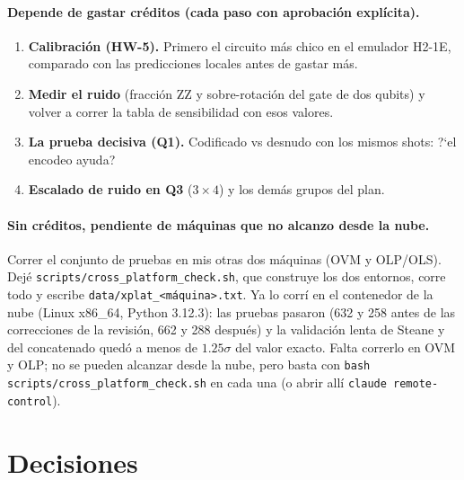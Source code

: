 \documentclass[11pt,a4paper]{article}
\begin{document}
\paragraph{Depende de gastar cr\'editos (cada paso con aprobaci\'on expl\'icita).}
\begin{enumerate}[leftmargin=1.6em]
  \item \textbf{Calibraci\'on (HW-5).} Primero el circuito m\'as chico en el emulador H2-1E, comparado con las
    predicciones locales antes de gastar m\'as.
  \item \textbf{Medir el ruido} (fracci\'on ZZ y sobre-rotaci\'on del gate de dos qubits) y volver a correr la
    tabla de sensibilidad con esos valores.
  \item \textbf{La prueba decisiva (Q1).} Codificado vs desnudo con los mismos shots: ?`el encodeo ayuda?
  \item \textbf{Escalado de ruido en Q3} ($3{\times}4$) y los dem\'as grupos del plan.
\end{enumerate}

\paragraph{Sin cr\'editos, pendiente de m\'aquinas que no alcanzo desde la nube.} Correr el conjunto de pruebas en
mis otras dos m\'aquinas (OVM y OLP/OLS). Dej\'e \texttt{scripts/cross\_platform\_check.sh}, que construye los dos
entornos, corre todo y escribe \texttt{data/xplat\_<m\'aquina>.txt}. Ya lo corr\'i en el contenedor de la nube (Linux x86\_64, Python 3.12.3): las pruebas pasaron (632 y 258 antes de las correcciones de la revisi\'on, 662 y 288 despu\'es) y la validaci\'on lenta de Steane y del concatenado qued\'o a menos de $1.25\sigma$ del valor exacto. Falta correrlo en OVM y OLP; no se pueden alcanzar desde la nube, pero basta con \texttt{bash scripts/cross\_platform\_check.sh} en cada una (o abrir all\'i \texttt{claude remote-control}).

\section{Decisiones}\label{sec:decisiones}
\end{document}
